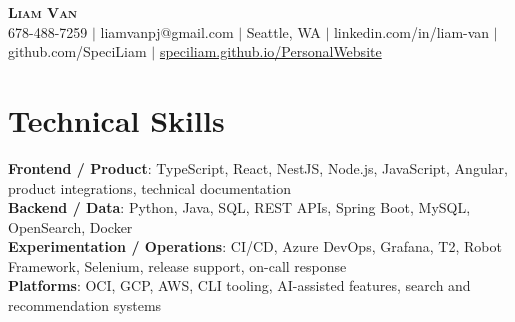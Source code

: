 \documentclass[letterpaper,11pt]{article}
\begin{document}

%
\begin{center}
    \textbf{\Huge \scshape Liam Van} \\ \vspace{1pt}
    \small 678-488-7259 $|$ \small {liamvanpj@gmail.com} $|$ Seattle, WA
 {{$|$ linkedin.com/in/liam-van} {$|$ github.com/SpeciLiam} {$|$ \href{https://speciliam.github.io/PersonalWebsite}{speciliam.github.io/PersonalWebsite}}}

\end{center}

\section{Technical Skills}
 \begin{itemize}[leftmargin=0.15in, label={}]
    \small{\item{
     \textbf{Frontend / Product}{: TypeScript, React, NestJS, Node.js, JavaScript, Angular, product integrations, technical documentation} \\
     \textbf{Backend / Data}{: Python, Java, SQL, REST APIs, Spring Boot, MySQL, OpenSearch, Docker} \\
     \textbf{Experimentation / Operations}{: CI/CD, Azure DevOps, Grafana, T2, Robot Framework, Selenium, release support, on-call response} \\
     \textbf{Platforms}{: OCI, GCP, AWS, CLI tooling, AI-assisted features, search and recommendation systems} \\
    }}
 \end{itemize}
%
\end{document}
